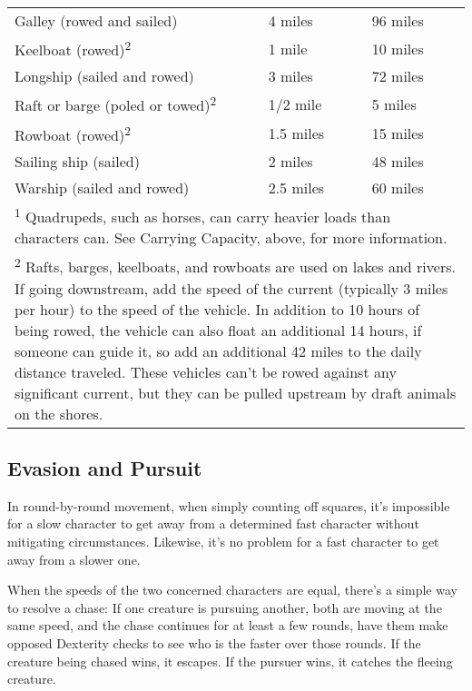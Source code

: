 \begin{table}[htb]
\begin{tabular}{l l l}
\hspace{1cm}Galley (rowed and sailed) & 4 miles & 96 miles\\
\hspace{1cm}Keelboat (rowed)\textsuperscript{2} & 1 mile & 10 miles\\
\hspace{1cm}Longship (sailed and rowed) & 3 miles & 72 miles\\
\hspace{1cm}Raft or barge (poled or towed)\textsuperscript{2} & 1/2 mile & 5 miles\\
\hspace{1cm}Rowboat (rowed)\textsuperscript{2} & 1.5 miles & 15 miles\\
\hspace{1cm}Sailing ship (sailed) & 2 miles & 48 miles\\
\hspace{1cm}Warship (sailed and rowed) & 2.5 miles & 60 miles\\
\multicolumn{3}{p{9.5cm}}{\textsuperscript{1} Quadrupeds, such as horses, can carry heavier loads than characters can. See Carrying Capacity, above, for more information.}\\
\multicolumn{3}{p{9.5cm}}{\textsuperscript{2} Rafts, barges, keelboats, and rowboats are used on lakes and rivers.
If going downstream, add the speed of the current (typically 3 miles per hour) to the speed of the vehicle. In addition to 10 hours of being rowed, the vehicle can also float an additional 14 hours, if someone can guide it, so add an additional 42 miles to the daily distance traveled. These vehicles can’t be rowed against any significant current, but they can be pulled upstream by draft animals on the shores.}\\
\end{tabular}
\end{table}
									
\subsection{Evasion and Pursuit}

				
In round-by-round movement, when simply counting off squares, it's impossible for a slow character to get away from a determined fast character without mitigating circumstances. Likewise, it's no problem for a fast character to get away from a slower one. 
				
When the speeds of the two concerned characters are equal, there's a simple way to resolve a chase: If one creature is pursuing another, both are moving at the same speed, and the chase continues for at least a few rounds, have them make opposed Dexterity checks to see who is the faster over those rounds. If the creature being chased wins, it escapes. If the pursuer wins, it catches the fleeing creature. 
				
